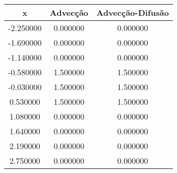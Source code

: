 \begin{tabular}{ccc}
\toprule
x & Advecção & Advecção-Difusão \\
\midrule
-2.250000 & 0.000000 & 0.000000 \\
-1.690000 & 0.000000 & 0.000000 \\
-1.140000 & 0.000000 & 0.000000 \\
-0.580000 & 1.500000 & 1.500000 \\
-0.030000 & 1.500000 & 1.500000 \\
0.530000 & 1.500000 & 1.500000 \\
1.080000 & 0.000000 & 0.000000 \\
1.640000 & 0.000000 & 0.000000 \\
2.190000 & 0.000000 & 0.000000 \\
2.750000 & 0.000000 & 0.000000 \\
\bottomrule
\end{tabular}
